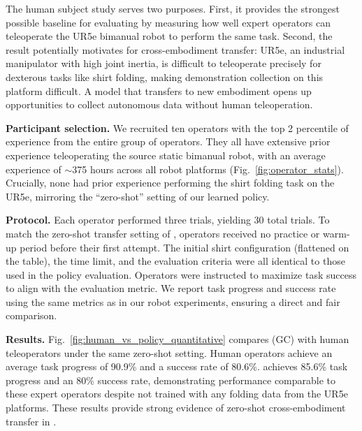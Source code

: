   \label{app:human_study}

The human subject study serves two purposes. First, it provides the strongest possible baseline for evaluating \MethodName{} by measuring how well expert operators can teleoperate the UR5e bimanual robot to perform the same task. Second, the result potentially motivates for cross-embodiment transfer: UR5e, an industrial manipulator with high joint inertia, is difficult to teleoperate precisely for dexterous tasks like shirt folding, making demonstration collection on this platform difficult. A model that transfers to new embodiment opens up opportunities to collect autonomous data without human teleoperation.

\textbf{Participant selection.} We recruited ten operators with the top 2 percentile of experience from the entire group of operators. They all have extensive prior experience teleoperating the source static bimanual robot, with an average experience of $\sim$375 hours across all robot platforms (Fig.~\ref{fig:operator_stats}). Crucially, none had prior experience performing the shirt folding task on the UR5e, mirroring the ``zero-shot'' setting of our learned policy.

\textbf{Protocol.} Each operator performed three trials, yielding 30 total trials. To match the zero-shot transfer setting of \MethodName{}, operators received no practice or warm-up period before their first attempt. The initial shirt configuration (flattened on the table), the time limit, and the evaluation criteria were all identical to those used in the \MethodName{} policy evaluation. Operators were instructed to maximize task success to align with the evaluation metric. We report task progress and success rate using the same metrics as in our robot experiments, ensuring a direct and fair comparison.

\textbf{Results.}
Fig.~\ref{fig:human_vs_policy_quantitative} compares \MethodName{} (GC) with human teleoperators under the same zero-shot setting. Human operators achieve an average task progress of 90.9\% and a success rate of 80.6\%. \MethodName{} achieves 85.6\% task progress and an 80\% success rate, demonstrating performance comparable to these expert operators despite not trained with any folding data from the UR5e platforms. These results provide strong evidence of zero-shot cross-embodiment transfer in \MethodName{}.

